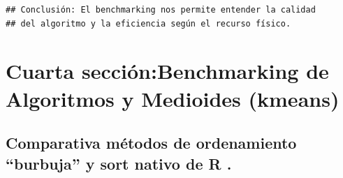 \documentclass[]{llncs}
\begin{document}
\begin{verbatim}
## Conclusión: El benchmarking nos permite entender la calidad 
## del algoritmo y la eficiencia según el recurso físico.
\end{verbatim}

\section{Cuarta sección:Benchmarking de Algoritmos y Medioides
(kmeans)}\label{cuarta-secciuxf3nbenchmarking-de-algoritmos-y-medioides-kmeans}

\subsection{Comparativa métodos de ordenamiento ``burbuja'' y sort
nativo de R
.}\label{comparativa-muxe9todos-de-ordenamiento-burbuja-y-sort-nativo-de-r-.}
\end{document}
